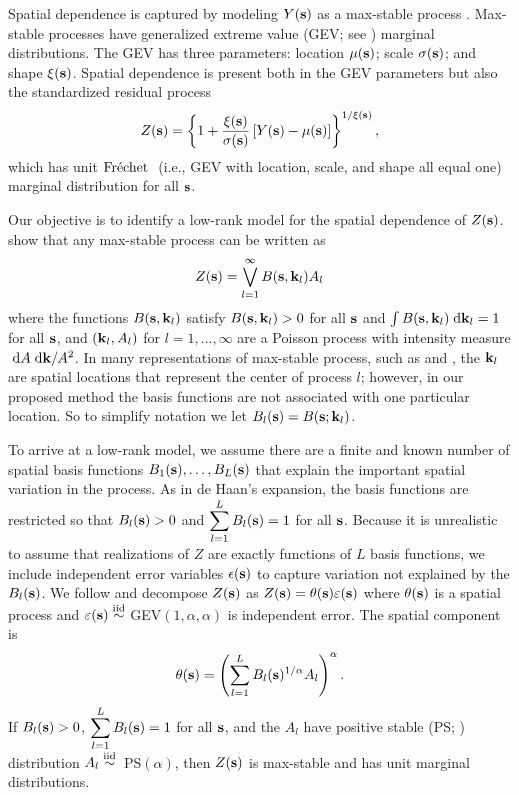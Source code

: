 Spatial dependence is captured by modeling $Y(\mathbf{s})$ as a max-stable process \citep{deHaan2006}.
Max-stable processes have generalized extreme value (GEV; see ) marginal distributions.
The GEV has three parameters: location $\mu(\mathbf{s})$; scale $\sigma(\mathbf{s})$; and shape $\xi(\mathbf{s})$.
Spatial dependence is present both in the GEV parameters but also the standardized residual process
\begin{align} \label{ebeq:Y2Z}
 Z(\mathbf{s}) = \left\{1+\frac{\xi(\mathbf{s})}{\sigma(\mathbf{s})}\left[Y(\mathbf{s}) - \mu(\mathbf{s})\right]\right\}^{1/\xi(\mathbf{s})},
\end{align}
which has unit $\mbox{Fr$\acute{\mbox{e}}$chet }$ (i.e., GEV with location, scale, and shape all equal one) marginal distribution for all $\mathbf{s}$.

Our objective is to identify a low-rank model for the spatial dependence of $Z(\mathbf{s})$.
 show that any max-stable process can be written as
\begin{align} \label{ebeq:spectral}
  Z(\mathbf{s}) = \bigvee_{l = 1}^{\infty} B(\mathbf{s}, \mathbf{k}_l)A_{l}
\end{align}
where the functions $B(\mathbf{s}, \mathbf{k}_l)$ satisfy $B(\mathbf{s}, \mathbf{k}_l) > 0$ for all $\mathbf{s}$ and $\int B(\mathbf{s}, \mathbf{k}_l) \; \text{d} \mathbf{k}_l = 1$ for all $\mathbf{s}$, and $(\mathbf{k}_l, A_l)$ for $l=1,\ldots,\infty$ are a Poisson process with intensity measure $\; \text{d} A \; \text{d} \mathbf{k}/A^2$.
In many representations of max-stable process, such as \citet{Smith1990} and \citet{Reich2012}, the $\mathbf{k}_l$ are spatial locations that represent the center of process $l$; however, in our proposed method the basis functions are not associated with one particular location.
So to simplify notation we let $B_l(\mathbf{s}) = B(\mathbf{s}; \mathbf{k}_l)$.

To arrive at a low-rank model, we assume there are a finite and known number of spatial basis functions $B_1(\mathbf{s}), \ldots, B_L(\mathbf{s})$ that explain the important spatial variation in the process.
As in de Haan's expansion, the basis functions are restricted so that $B_l(\mathbf{s}) > 0$ and $\displaystyle \sum_{l = 1}^L B_l(\mathbf{s}) = 1$ for all $\mathbf{s}$.
Because it is unrealistic to assume that realizations of $Z$ are exactly functions of $L$ basis functions, we include independent error variables $\epsilon(\mathbf{s})$ to capture variation not explained by the $B_l(\mathbf{s})$.
We follow \citet{Reich2012} and decompose $Z(\mathbf{s})$ as $Z(\mathbf{s})=\theta(\mathbf{s})\varepsilon(\mathbf{s})$ where $\theta(\mathbf{s})$ is a spatial process and $\varepsilon(\mathbf{s})\stackrel{\mathrm{iid}}{\sim}$ GEV$(1,\alpha,\alpha)$ is independent error.
The spatial component is
\begin{align} \label{ebeq:theta}
  \theta(\mathbf{s}) = \left(\sum_{l=1}^LB_{l}(\mathbf{s})^{1/\alpha}A_{l}\right)^{\alpha}.
\end{align}
If $B_{l}(\mathbf{s})>0$, $\displaystyle \sum_{l=1}^LB_{l}(\mathbf{s})=1$ for all $\mathbf{s}$, and the $A_{l}$ have positive stable (PS; ) distribution \mbox{$A_{l}\stackrel{\mathrm{iid}}{\sim}$ PS$(\alpha)$}, then $Z(\mathbf{s})$ is max-stable and has unit \Frechet marginal distributions.

